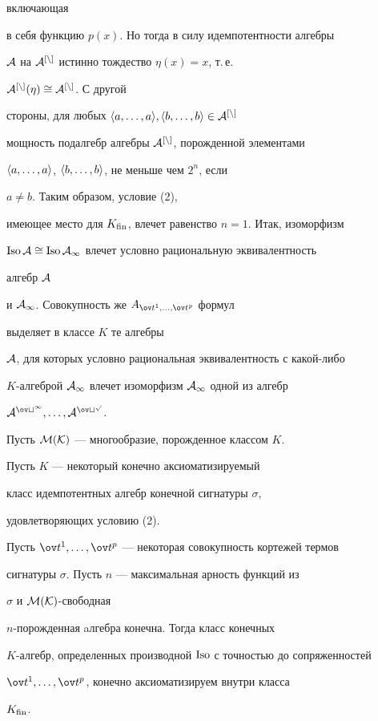 \begin{pf}
включающая 


в себя функцию $p(x)$. Но тогда в силу идемпотентности алгебры 


$\cal A$ на $\cal A^{[n]}$ истинно тождество $\eta(x)=x$, т.\,е.\ 


$\cal A^{[n]}(\eta)\cong\cal A^{[n]}$. С другой 


стороны, для любых $\la a,\dotsc,a\ra,\la b,\dotsc,b\ra\in\cal 


A^{[n]}$ 


мощность подалгебр алгебры $\cal A^{[n]}$, порожденной элементами 


$\langle a,\dotsc,a\rangle$, $\langle b,\dotsc,b\rangle$, не меньше чем $2^n$, если 


$a\ne b$. Таким образом, условие (2), 


имеющее место для $K_{\operatorname{fin}}$, влечет равенство $n=1$. Итак, изоморфизм 


$\operatorname{Iso}\cal A\cong\operatorname{Iso}\cal A_1$ влечет условно рациональную эквивалентность 


алгебр $\cal A$ 


и $\cal A_1$. Совокупность же $A_{\ov t^1,\dotsc,\ov t^p}$ формул 


выделяет в классе $K$ те алгебры 


$\cal A$, для которых условно рациональная эквивалентность с какой-либо 


$K$-алгеброй $\cal A_1$ влечет изоморфизм $\cal A_1$ одной из алгебр 


$\cal A^{\ov t^1},\dotsc,\cal A^{\ov t^p}$. 


\end{pf} 


 


Пусть $\cal M(K)$ --- многообразие, порожденное классом $K$. 


 


\begin{cor} 


Пусть $K$ --- некоторый конечно аксиоматизируемый 


класс идемпотентных алгебр конечной сигнатуры $\sigma$, 


удовлетворяющих условию (2). 


Пусть $\ov t^1,\dotsc,\ov t^p$ --- некоторая совокупность кортежей термов 


сигнатуры $\sigma$. Пусть $n$ --- максимальная арность функций из 


$\sigma$ и $\cal M(K)$-свободная


$n$-порожденная aлгебра конечна. Тогда класс конечных 


$K$-алгебр, определенных производной $\operatorname{Iso}$ с точностью до сопряженностей 


$\ov t^1,\dotsc,\ov t^p$, конечно аксиоматизируем внутри класса 


$K_{\operatorname{fin}}$. 


\end{cor} 


